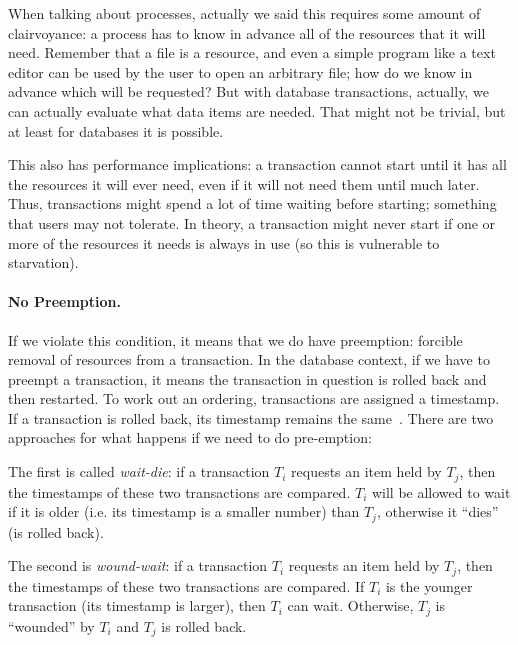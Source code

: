 \documentclass[a4paper]{report}
\begin{document}
When talking about processes, actually we said this requires some amount of clairvoyance: a process has to know in advance all of the resources that it will need. Remember that a file is a resource, and even a simple program like a text editor can be used by the user to open an arbitrary file; how do we know in advance which will be requested? But with database transactions, actually, we can actually evaluate what data items are needed. That might not be trivial, but at least for databases it is possible.

This also has performance implications: a transaction cannot start until it has all the resources it will ever need, even if it will not need them until much later. Thus, transactions might spend a lot of time waiting before starting; something that users may not tolerate. In theory, a transaction might never start if one or more of the resources it needs is always in use (so this is vulnerable to starvation).
 


\paragraph{No Preemption.} If we violate this condition, it means that we do have preemption: forcible removal of resources from a transaction. In the database context, if we have to preempt a transaction, it means the transaction in question is rolled back and then restarted. To work out an ordering, transactions are assigned a timestamp. If a transaction is rolled back, its timestamp remains the same~\cite{dsc}. There are two approaches for what happens if we need to do pre-emption:

The first is called \textit{wait-die}: if a transaction $T_{i}$ requests an item held by $T_{j}$, then the timestamps of these two transactions are compared. $T_{i}$ will be allowed to wait if it is older (i.e. its timestamp is a smaller number) than $T_{j}$, otherwise it ``dies'' (is rolled back). 

The second is \textit{wound-wait}: if a transaction $T_{i}$ requests an item held by $T_{j}$, then the timestamps of these two transactions are compared. If $T_{i}$ is the younger transaction (its timestamp is larger), then $T_{i}$ can wait. Otherwise, $T_{j}$ is ``wounded'' by $T_{i}$ and $T_{j}$ is rolled back.
\end{document}
